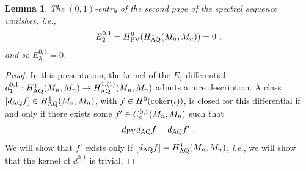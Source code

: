 \documentclass[11pt]{amsart}
\numberwithin{equation}{section}
\newtheorem{lemma}[theo]{Lemma}
\theoremstyle{definition}
\newcommand{\AQ}{{\textup{AQ}}}
\newcommand{\coker}{{\textup{coker}}}
\newcommand{\0}{{\textbf{0}}}
\def \ie{{\it i.e.}}
\begin{document}
\begin{lemma}\label{lem:E2 Harrison vanishes for min model}
The $(0,1)$-entry of the second page of the spectral sequence vanishes, \ie,
\[
E_2^{0,1} = H^0_{\rm PV}(H^1_{\AQ}(M_n,M_n)) =0 ~,
\]
and so $E_3^{0,1}=0$.
\end{lemma}
\begin{proof}
In this presentation, the kernel of the $E_1$-differential $d_1^{0,1}:H^1_{\AQ}(M_n,M_n) \rightarrow H^{1,\langle 1 \rangle}_{\rm AQ}(M_n,M_n)$ admits a nice description. A class $[d_{\AQ} f]\in H^1_{\AQ}(M_n,M_n)$, with $f\in H^0(\coker(\iota))$, is closed for this differential if and only if there exists some $f'\in C^{0,1}_{\rm c}(M_n,M_n)$ such that
\[
d_{\rm PV} d_{\AQ} f = d_{\AQ} f' ~.
\] 
We will show that $f'$ exists only if $[d_{\AQ} f]= H^1_{\AQ}(M_n,M_n)$, \ie, we will show that the kernel of $d_1^{0,1}$ is trivial.



\end{proof}
\end{document}

